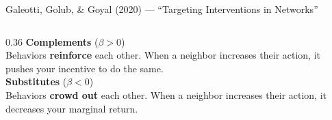 \documentclass[aspectratio=169]{beamer}
\begin{document}
\begin{frame}[shrink=5]{Galeotti, Golub, \& Goyal (2020) --- ``Targeting Interventions in Networks''}
\begin{columns}[T]
\begin{column}{0.36\textwidth}
        \vspace{1pt}
        {\color{accentgreen}\bfseries Complements} {\small($\beta > 0$)}\\[1pt]
        {\small Behaviors \textbf{reinforce} each other. When a neighbor increases their action, it pushes your incentive to do the same.}\\[3pt]
        {\color{accentred}\bfseries Substitutes} {\small($\beta < 0$)}\\[1pt]
        {\small Behaviors \textbf{crowd out} each other. When a neighbor increases their action, it decreases your marginal return.}
    \end{column}
\end{columns}
\end{frame}

\end{document}
